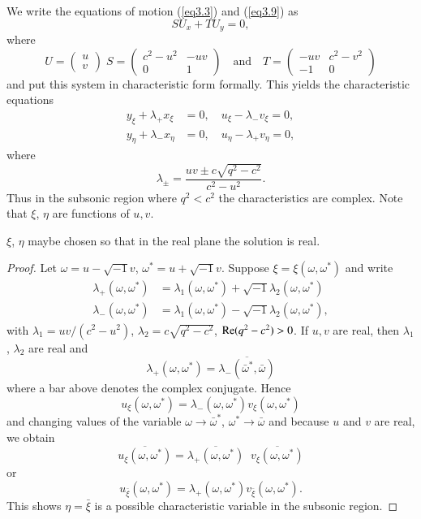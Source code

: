 We write the equations of motion (\ref{eq3.3}) and (\ref{eq3.9}) as
$$
SU_x + TU_y = 0,
$$
where 
$$
U = 
\begin{pmatrix}
u\\v
\end{pmatrix} \; 
S = 
\begin{pmatrix}
c^2 - u^2 & -uv\\
0 & 1
\end{pmatrix} \quad \text{and} \quad  
T = 
\begin{pmatrix}
-uv & c^2 - v^2\\
-1 & 0
\end{pmatrix}
$$
and put this system in characteristic form formally. This yields the characteristic equations
\begin{equation*}
\begin{split}
y_\xi + \lambda_+ x_\xi & = 0, \quad u_\xi - \lambda_- v_\xi  =0,\\
y_\eta + \lambda_- x_\eta & = 0, \quad u_\eta -\lambda_+ v_\eta = 0,
\end{split} \tag{3.35}\label{eq3.35}
\end{equation*}
where 
$$
\lambda_{\pm} = \frac{uv \pm c \sqrt{q^2 -c^2}}{c^2 -u^2}. 
$$
Thus in the subsonic region where $q^2 < c^2$ the characteristics are complex. Note that $\xi$, $\eta$ are functions of $u,v$.

\begin{claim*}
$\xi$, $\eta$ may\pageoriginale be chosen so that in the real plane the solution is real. 
\end{claim*}

\begin{proof}
Let $\omega = u - \sqrt{-1} v$, $\omega^* = u + \sqrt{-1} v$. Suppose $\xi = \xi (\omega, \omega^*)$ and write 
\begin{align*}
\lambda_+ (\omega, \omega^*) & = \lambda_1 (\omega, \omega^*) + \sqrt{-1} \lambda_2 (\omega, \omega^*)\\
\lambda_- (\omega, \omega^*) & = \lambda_1 (\omega, \omega^*) - \sqrt{-1} \lambda_2 (\omega, \omega^*),
\end{align*}
with $\lambda_1 = uv/ (c^2 - u^2)$, $\lambda_2 = c \sqrt{q^2 - c^2}$, $\operatorname{Re} (q^2 -c^2) > 0$. If $u,v$ are real, then $\lambda_1$, $\lambda_2$ are real and 
$$
\lambda_+ (\omega, \omega^*) = \overline{\lambda_-(\bar{\omega}^*, \bar{\omega})}
$$
where a bar above denotes the complex conjugate. Hence
$$
u_\xi (\omega,\omega^*) = \lambda_- (\omega, \omega^*) v_\xi (\omega, \omega^*)
$$
and changing values of the variable $\omega \to \bar{\omega}^*$, $\omega^* \to \bar{\omega}$ and because $u$ and $v$ are real, we obtain
$$
\overline{u_\xi (\omega, \omega^*)} = \overline{\lambda_+ (\omega, \omega^*)} \; \; \overline{v_\xi (\omega, \omega^*)}
$$
or 
$$
u_{\bar{\xi}} (\omega, \omega^*) = \lambda_+ (\omega, \omega^*) v_{\bar{\xi}} (\omega, \omega^*) . 
$$
This shows $\eta = \bar{\xi}$ is a possible characteristic variable in the subsonic region. 
\end{proof}

